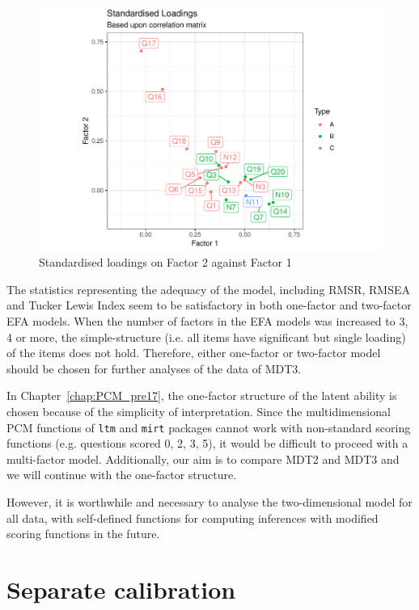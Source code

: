 \documentclass[a4paper]{report}
\begin{document}
\begin{figure}[H]
  \centering
  \includegraphics[width=\linewidth]{fig/IMPRV_EFA_17_2.pdf}
  \caption{\label{fig:IMPRV_EFA_17_2}Standardised loadings on Factor 2 against Factor 1}
\end{figure}

The statistics representing the adequacy of the model, including RMSR, RMSEA and Tucker Lewis Index seem to be satisfactory in both one-factor and two-factor EFA models. When the number of factors in the EFA models was increased to 3, 4 or more, the simple-structure (i.e. all items have significant but single loading) of the items does not hold. Therefore, either one-factor or two-factor model should be chosen for further analyses of the data of MDT3. 

In Chapter~\ref{chap:PCM_pre17}, the one-factor structure of the latent ability is chosen because of the simplicity of interpretation. Since the multidimensional PCM functions of \texttt{ltm} and \texttt{mirt} packages cannot work with non-standard scoring functions (e.g. questions scored 0, 2, 3, 5), it would be difficult to proceed with a multi-factor model. Additionally, our aim is to compare MDT2 and MDT3 and we will continue with the one-factor structure. 

However, it is worthwhile and necessary to analyse the two-dimensional model for all data, with self-defined functions for computing inferences with modified scoring functions in the future. 

\section{Separate calibration}
\end{document}

